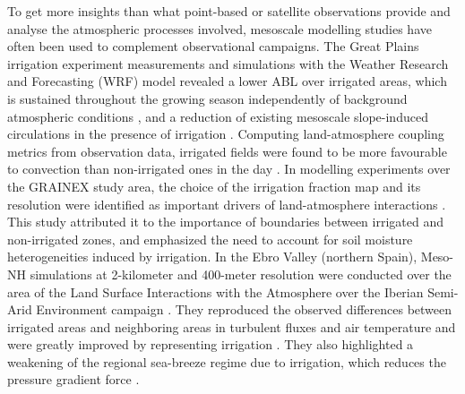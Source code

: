 To get more insights than what point-based or satellite observations provide and analyse the atmospheric processes involved, mesoscale modelling studies have often been used to complement observational campaigns. 
The Great Plains irrigation experiment \citep[GRAINEX,][]{rappin_great_2021} measurements and simulations with the Weather Research and Forecasting (WRF) model revealed a lower ABL over irrigated areas, which is sustained throughout the growing season independently of background atmospheric conditions \citep{lachenmeier_irrigated_2024}, and a reduction of existing mesoscale slope-induced circulations in the presence of irrigation \citep{rappin_landatmosphere_2022, phillips_influence_2022}. Computing land-atmosphere coupling metrics from observation data, irrigated fields were found to be more favourable to convection than non-irrigated ones in the day \citep{whitesel_assessing_2024}. In modelling experiments over the GRAINEX study area, the choice of the irrigation fraction map and its resolution were identified as important drivers of land-atmosphere interactions \citep{lawston-parker_investigating_2023}. This study attributed it to the importance of boundaries between irrigated and non-irrigated zones, and emphasized the need to account for soil moisture heterogeneities induced by irrigation.
In the Ebro Valley (northern Spain), Meso-NH simulations at 2-kilometer and 400-meter resolution were conducted over the area of the Land Surface Interactions with the Atmosphere over the Iberian Semi-Arid Environment campaign \citep[LIAISE, ][, which will be further presented in Chapter \ref{chap:liaise}]{boone_land_2019}. They reproduced the observed differences between irrigated areas and neighboring areas in turbulent fluxes and air temperature and were greatly improved by representing irrigation \citep{lunel_irrigation_2024}. They also highlighted a weakening of the regional sea-breeze regime due to irrigation, which reduces the pressure gradient force \citep{lunel_marinada_2024}.  

